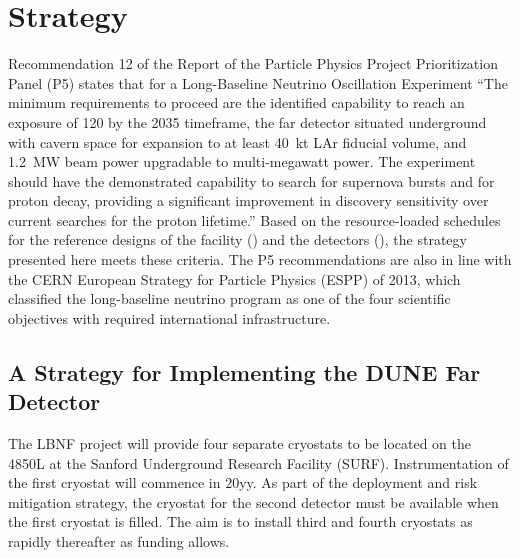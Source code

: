 
\chapter{Strategy}
\label{v1ch:strategy}


Recommendation 12 of the Report of the Particle Physics Project Prioritization Panel (P5) 
states that for a Long-Baseline Neutrino Oscillation Experiment ``The 
minimum requirements to proceed are the identified capability to reach an exposure 
of \num{120}\ktMWyr{} by the 2035 timeframe, the far detector situated underground 
with cavern space for expansion to at least 40~kt LAr fiducial volume, and 1.2~MW 
beam power upgradable to multi-megawatt power. The experiment should have the demonstrated 
capability to search for supernova bursts and for proton decay, providing a significant 
improvement in discovery sensitivity over current searches for the proton lifetime.'' 
Based on the resource-loaded schedules for the reference designs of the facility (\vollbnf)
and the detectors (\voldune), the strategy presented here meets these criteria. 
The P5 recommendations are also in line with the CERN European Strategy for Particle 
Physics (ESPP) of 2013, which classified the long-baseline neutrino program as 
one of the four scientific objectives with required international infrastructure.

\section{A Strategy for Implementing the DUNE Far Detector}

The LBNF project will provide four separate cryostats to be located on the 4850L at the 
Sanford Underground Research Facility (SURF).  Instrumentation of the first cryostat 
will commence in 20yy. %
As part of the deployment and risk mitigation strategy, 
the cryostat for the second detector must be available when the first cryostat 
is filled. The aim is to install third and fourth cryostats as rapidly thereafter as funding 
allows.

